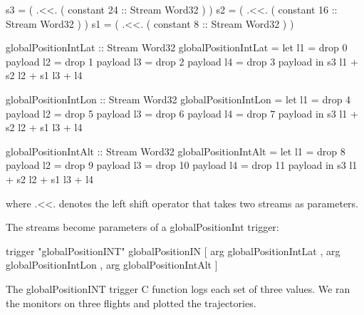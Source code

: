 \begin{code}
s3 = ( .<<. ( constant 24 :: Stream Word32 ) )
s2 = ( .<<. ( constant 16 :: Stream Word32 ) )
s1 = ( .<<. ( constant 8  :: Stream Word32 ) )

globalPositionIntLat :: Stream Word32
globalPositionIntLat = let l1 = drop 0 payload
                           l2 = drop 1 payload
                           l3 = drop 2 payload
                           l4 = drop 3 payload
                       in s3 l1 + s2 l2 + s1 l3 + l4

globalPositionIntLon :: Stream Word32
globalPositionIntLon = let l1 = drop 4 payload
                           l2 = drop 5 payload
                           l3 = drop 6 payload
                           l4 = drop 7 payload
                       in s3 l1 + s2 l2 + s1 l3 + l4

globalPositionIntAlt :: Stream Word32
globalPositionIntAlt = let l1 = drop 8  payload
                           l2 = drop 9  payload
                           l3 = drop 10 payload
                           l4 = drop 11 payload
                       in s3 l1 + s2 l2 + s1 l3 + l4
\end{code}
where $\texttt{.<<.}$ denotes the left shift operator that takes two streams as parameters.

The streams become parameters of a globalPositionInt trigger:

\begin{code}
trigger "globalPositionINT" globalPositionIN
                  [ arg globalPositionIntLat
                  , arg globalPositionIntLon
                  , arg globalPositionIntAlt ]
\end{code}

The globalPositionINT trigger C function logs each set of three values. We ran
the monitors on three flights and plotted the trajectories.

